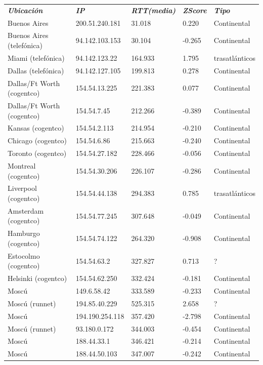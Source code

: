 \begin{tabular}{lllll}

	\textit{\textbf{Ubicaci\'on}}	&	\textit{\textbf{IP}}	&	\textit{\textbf{RTT(media)}}	&	\textit{\textbf{ZScore}}	&	\textit{\textbf{Tipo}}	\\
	Buenos Aires	&	200.51.240.181	&	31.018	&	0.220	&	Continental	\\
	Buenos Aires (telef\'onica)	&	94.142.103.153	&	30.104	&	-0.265	&	Continental	\\
	Miami (telef\'onica)		&	94.142.123.22	&	164.933	&	1.795	&	trasatl\'anticos	\\
	Dallas (telef\'onica)		&	94.142.127.105	&	199.813	&	0.278	&	Continental	\\
	Dallas/Ft Worth (cogentco)	&	154.54.13.225	&	221.383	&	0.077	&	Continental	\\
	Dallas/Ft Worth (cogentco)	&	154.54.7.45	&	212.266	&	-0.389	&	Continental	\\
	Kansas (cogentco)		&	154.54.2.113	&	214.954	&	-0.210	&	Continental	\\
	Chicago (cogentco)		&	154.54.6.86	&	215.663	&	-0.240	&	Continental	\\
	Toronto (cogentco)		&	154.54.27.182	&	228.466	&	-0.056	&	Continental	\\
	Montreal (cogentco)	&	154.54.30.206	&	226.107	&	-0.286	&	Continental	\\
	Liverpool (cogentco)	&	154.54.44.138	&	294.383	&	0.785	&	trasatl\'anticos	\\
	Amsterdam (cogentco)	&	154.54.77.245	&	307.648	&	-0.049	&	Continental	\\
	Hamburgo (cogentco)	&	154.54.74.122	&	264.320	&	-0.908	&	Continental	\\
	Estocolmo (cogentco)	&	154.54.63.2	&	327.827	&	0.713	&	?	\\
	Helsinki (cogentco)		&	154.54.62.250	&	332.424	&	-0.181	&	Continental	\\
	Mosc\'u			&	149.6.58.42	&	333.589	&	-0.233	&	Continental	\\
	Mosc\'u (runnet)		&	194.85.40.229	&	525.315	&	2.658	&	?	\\
	Mosc\'u 			&	194.190.254.118	&	357.420	&	-2.798	&	Continental	\\
	Mosc\'u (runnet)		&	93.180.0.172	&	344.003	&	-0.454	&	Continental	\\
	Mosc\'u			&	188.44.33.1	&	346.421	&	-0.214	&	Continental	\\ 	
	Mosc\'u			&	188.44.50.103	&	347.007	&	-0.242	&	Continental	\\	

\end{tabular}

